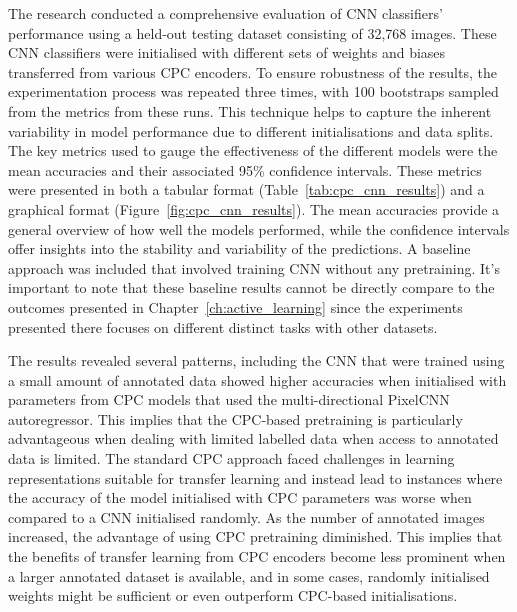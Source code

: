 The research conducted a comprehensive evaluation of CNN classifiers' performance using a held-out testing dataset consisting of 32,768 images. These CNN classifiers were initialised with different sets of weights and biases transferred from various CPC encoders. To ensure robustness of the results, the experimentation process was repeated three times, with 100 bootstraps sampled from the metrics from these runs. This technique helps to capture the inherent variability in model performance due to different initialisations and data splits. The key metrics used to gauge the effectiveness of the different models were the mean accuracies and their associated 95\% confidence intervals. These metrics were presented in both a tabular format (Table~\ref{tab:cpc_cnn_results}) and a graphical format (Figure~\ref{fig:cpc_cnn_results}). The mean accuracies provide a general overview of how well the models performed, while the confidence intervals offer insights into the stability and variability of the predictions. A baseline approach was included that involved training CNN without any pretraining. It’s important to note that these baseline results cannot be directly compare to the outcomes presented in Chapter~\ref{ch:active_learning} since the experiments presented there focuses on different distinct tasks with other datasets.

The results revealed several patterns, including the CNN that were trained using a small amount of annotated data showed higher accuracies when initialised with parameters from CPC models that used the multi-directional PixelCNN autoregressor. This implies that the CPC-based pretraining is particularly advantageous when dealing with limited labelled data when access to annotated data is limited. The standard CPC approach faced challenges in learning representations suitable for transfer learning and instead lead to instances where the accuracy of the model initialised with CPC parameters was worse when compared to a CNN initialised randomly. As the number of annotated images increased, the advantage of using CPC pretraining diminished. This implies that the benefits of transfer learning from CPC encoders become less prominent when a larger annotated dataset is available, and in some cases, randomly initialised weights might be sufficient or even outperform CPC-based initialisations.

